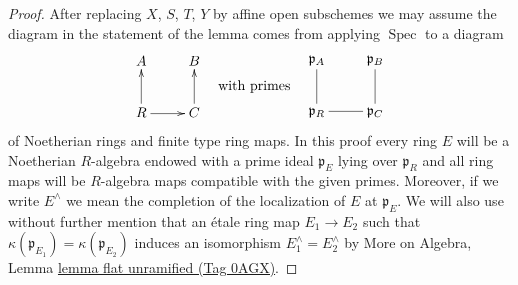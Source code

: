 \documentclass{amsart}
\theoremstyle{plain}
\theoremstyle{definition}
\theoremstyle{remark}
\numberwithin{equation}{subsection}
\def\Spec{\mathop{\mathrm{Spec}}}
\begin{document}
\begin{proof}
After replacing $X$, $S$, $T$, $Y$ by affine open subschemes we
may assume the diagram in the statement of the lemma comes
from applying $\Spec$ to a diagram
$$
\vcenter{
\xymatrix{
A & B \\
R \ar[u] \ar[r] & C \ar[u]
}
}
\quad\text{with primes}\quad
\vcenter{
\xymatrix{
\mathfrak p_A & \mathfrak p_B \\
\mathfrak p_R \ar@{-}[u] \ar@{-}[r] & \mathfrak p_C \ar@{-}[u]
}
}
$$
of Noetherian rings and finite type ring maps.
In this proof every ring $E$ will be a Noetherian $R$-algebra endowed with
a prime ideal $\mathfrak p_E$ lying over $\mathfrak p_R$ and all ring maps
will be $R$-algebra maps compatible with the given primes. Moreover,
if we write $E^\wedge$ we mean the completion of the localization
of $E$ at $\mathfrak p_E$. We will also use without further mention
that an \'etale ring map $E_1 \to E_2$ such that
$\kappa(\mathfrak p_{E_1}) = \kappa(\mathfrak p_{E_2})$ induces
an isomorphism $E_1^\wedge = E_2^\wedge$ by
More on Algebra, Lemma \href{https://stacks.math.columbia.edu/tag/0AGX}{lemma flat unramified (Tag 0AGX)}.


\end{proof}
\end{document}
